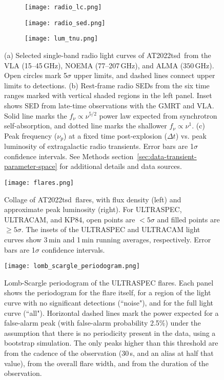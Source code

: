 \documentclass{nature_plusfigure}
\newcommand{\at}{AT2022tsd}
\begin{document}
\begin{extended_data}
\begin{figure}[!ht]
 \centering
 \begin{subfigure}[t]{0.50\textwidth}
 \centering
\texttt{[image: radio\_lc.png]}
\caption{}
\end{subfigure}
 \begin{subfigure}[t]{0.46\textwidth}
 \centering
\texttt{[image: radio\_sed.png]}
\caption{}
\end{subfigure}
 \begin{subfigure}[t]{\textwidth}
 \centering
\texttt{[image: lum\_tnu.png]}
\caption{}
\end{subfigure}
  \caption{(a) Selected single-band radio light curves of \at\ from the VLA (15--45\,GHz), NOEMA (77--207\,GHz), and ALMA ($350$\,GHz). Open circles mark 5$\sigma$ upper limits, and dashed lines connect upper limits to detections. (b) Rest-frame radio SEDs from the six time ranges marked with vertical shaded regions in the left panel. Inset shows SED from late-time observations with the GMRT and VLA. Solid line marks the $f_\nu \propto \nu^{5/2}$ power law expected from synchrotron self-absorption, and dotted line marks the shallower $f_\nu \propto \nu^{1}$. (c) Peak frequency ($\nu_p$) at a fixed time post-explosion ($\Delta t$) vs. peak luminosity of extragalactic radio transients. Error bars are 1$\sigma$ confidence intervals. See Methods section~\ref{sec:data-transient-parameter-space} for additional details and data sources.}
 \label{fig:radio}
\end{figure}

\begin{figure}[ht]
 \centering
\texttt{[image: flares.png]}
  \caption{Collage of \at\ flares, with flux density (left) and approximate peak luminosity (right). For ULTRASPEC, ULTRACAM, and KP84, open points are $<5\sigma$ and filled points are $\geq5\sigma$. The insets of the ULTRASPEC and ULTRACAM light curves show 3\,min and 1\,min running averages, respectively. Error bars are 1$\sigma$ confidence intervals.
}
 \label{fig:flare-collage}
\end{figure}

\begin{figure*}[ht]
    \centering
    \texttt{[image: lomb\_scargle\_periodogram.png]}
    \caption{Lomb-Scargle periodogram of the ULTRASPEC flares. Each panel shows the periodogram for the flare itself, for a region of the light curve with no significant detections (``noise"), and for the full light curve (``all"). Horizontal dashed lines mark the power expected for a false-alarm peak (with false-alarm probability 2.5\%) under the assumption that there is no periodicity present in the data, using a bootstrap simulation. The only peaks higher than this threshold are from the cadence of the observation (30\,s, and an alias at half that value), from the overall flare width, and from the duration of the observation.}
    \label{fig:ultraspec-periodogram}
\end{figure*}


\end{extended_data}
\end{document}
